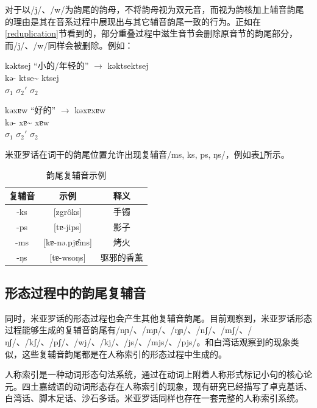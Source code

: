 对于以/j/、/w/为韵尾的韵母，不将韵母视为双元音，而视为韵核加上辅音韵尾的理由是其在音系过程中展现出与其它辅音韵尾一致的行为。正如在\ref{reduplication}节看到的，部分重叠过程中滋生音节会删除原音节的韵尾部分，而/j/、/w/同样会被删除。例如：

\begin{exe}
\ex kəktsej “小的/年轻的” $\rightarrow$ kəktsektsej \\
\gll kə- {ktse\textasciitilde} ktsej \\
     $\sigma_{1}$ $\sigma_{2}'$ $\sigma_{2}$ \\
\end{exe}

\begin{exe}
\ex kəxɐw “好的” $\rightarrow$ kəxɐxɐw \\
\gll kə- {xɐ\textasciitilde} xɐw \\
     $\sigma_{1}$ $\sigma_{2}'$ $\sigma_{2}$ \\
\end{exe}

米亚罗话在词干的韵尾位置允许出现复辅音/ms, ks, ps, ŋs/，例如表\ref{comcoda}所示。

\begin{table}[H]
\vspace{5pt}
    \centering
    \caption{韵尾复辅音示例}
    \label{comcoda}
\begin{tabular}{c|cc}
     \toprule
复辅音   & 示例              & 释义\\
     \midrule
	-ks & {[}zgrôks{]}      & 手镯    \\
-ps & {[}tɐ-jips{]}      & 影子    \\
-ms & {[}kɐ-nə.pjɐ̂ms{]} & 烤火    \\
-ŋs & {[}tɐ-wsoŋs{]}     & 驱邪的香薰\\
   \bottomrule
\end{tabular}
\end{table}

\subsection{形态过程中的韵尾复辅音}\label{codacom}

同时，米亚罗话的形态过程也会产生其他复辅音韵尾。目前观察到，米亚罗话形态过程能够生成的复辅音韵尾有/nɲ/、/mɲ/、/ŋɲ/、/nʃ/、/mʃ/、/ŋʃ/、/kʃ/、/pʃ/、/wj/、/kj/、/js/、/mjs/、/pjs/。和白湾话观察到的现象类似，这些复辅音韵尾都是在人称索引的形态过程中生成的\cite[68-69]{zhang2016phonologie}。

人称索引是一种动词形态句法系统，通过在动词上附着人称形式标记小句的核心论元\cite{Haspelmath2013-mu}。四土嘉绒语的动词形态存在人称索引的现象，现有研究已经描写了卓克基话\cite{Lin-2016-dr}、白湾话\cite{Zhang2018-qm,Zhang2020-ya}、脚木足话\cite{prins2011web}、沙石多话\cite{Sun2015-ss}。米亚罗话同样也存在一套完整的人称索引系统。

